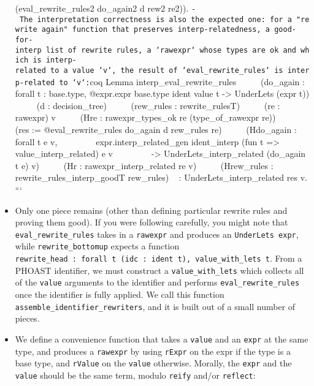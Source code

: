 \begin{itemize}
  (eval\_rewrite\_rules2 do\_again2 d rew2 re2)).
  \texttt{-\ The\ interpretation\ correctness\ is\ also\ the\ expected\ one:\ for\ a\ "rewrite\ again"\ function\ that\ preserves\ interp-relatedness,\ a\ good-for-interp\ list\ of\ rewrite\ rules,\ a\ `rawexpr`\ whose\ types\ are\ ok\ and\ which\ is\ interp-related\ to\ a\ value\ `v`,\ the\ result\ of\ `eval\_rewrite\_rules`\ is\ interp-related\ to\ `v`:}coq
  Lemma interp\_eval\_rewrite\_rules ~ ~ ~ (do\_again : forall t :
  base.type, @expr.expr base.type ident value t -\textgreater{}
  UnderLets (expr t)) ~ ~ ~ (d : decision\_tree) ~ ~ ~ (rew\_rules :
  rewrite\_rulesT) ~ ~ ~ (re : rawexpr) v ~ ~ ~ (Hre :
  rawexpr\_types\_ok re (type\_of\_rawexpr re)) ~ ~ ~ (res :=
  @eval\_rewrite\_rules do\_again d rew\_rules re) ~ ~ ~ (Hdo\_again :
  forall t e v, ~ ~ ~ ~ ~ expr.interp\_related\_gen ident\_interp (fun t
  =\textgreater{} value\_interp\_related) e v ~ ~ ~ ~ ~ -\textgreater{}
  UnderLets\_interp\_related (do\_again t e) v) ~ ~ ~ (Hr :
  rawexpr\_interp\_related re v) ~ ~ ~ (Hrew\_rules :
  rewrite\_rules\_interp\_goodT rew\_rules) ~ :
  UnderLets\_interp\_related res v. ```
\item
  Only one piece remains (other than defining particular rewrite rules
  and proving them good). If you were following carefully, you might
  note that \texttt{eval\_rewrite\_rules} takes in a \texttt{rawexpr}
  and produces an \texttt{UnderLets\ expr}, while
  \texttt{rewrite\_bottomup} expects a function
  \texttt{rewrite\_head\ :\ forall\ t\ (idc\ :\ ident\ t),\ value\_with\_lets\ t}.
  From a PHOAST identifier, we must construct a
  \texttt{value\_with\_lets} which collects all of the \texttt{value}
  arguments to the identifier and performs \texttt{eval\_rewrite\_rules}
  once the identifier is fully applied. We call this function
  \texttt{assemble\_identifier\_rewriters}, and it is built out of a
  small number of pieces.
\item
  We define a convenience function that takes a \texttt{value} and an
  \texttt{expr} at the same type, and produces a \texttt{rawexpr} by
  using \texttt{rExpr} on the expr if the type is a base type, and
  \texttt{rValue} on the \texttt{value} otherwise. Morally, the
  \texttt{expr} and the \texttt{value} should be the same term, modulo
  \texttt{reify} and/or \texttt{reflect}:


\end{itemize}
